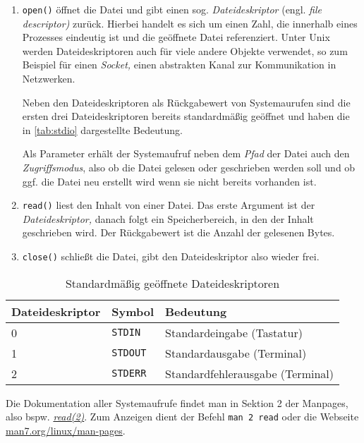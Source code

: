 \begin{enumerate}
  \item \texttt{open()} öffnet die Datei und gibt einen sog. \emph{Dateideskriptor} (engl.
   \emph{file descriptor)} zurück. Hierbei handelt es sich um einen Zahl, die innerhalb eines 
   Prozesses eindeutig ist und die geöffnete Datei referenziert. Unter Unix werden 
   Dateideskriptoren auch für viele andere Objekte verwendet, so zum Beispiel für einen
   \emph{Socket,} einen abstrakten Kanal zur Kommunikation in Netzwerken.

   Neben den Dateideskriptoren als Rückgabewert von Systemaurufen sind die ersten drei 
   Dateideskriptoren bereits standardmäßig geöffnet und haben die in \autoref{tab:stdio} 
   dargestellte Bedeutung.

   Als Parameter erhält der Systemaufruf neben dem \emph{Pfad} der Datei auch den 
   \emph{Zugriffsmodus}, also ob die Datei gelesen oder geschrieben werden soll und ob ggf. die 
   Datei neu erstellt wird wenn sie nicht bereits vorhanden ist.

  \item \texttt{read()} liest den Inhalt von einer Datei. Das erste Argument ist der
   \emph{Dateideskriptor,} danach folgt ein Speicherbereich, in den der Inhalt geschrieben wird.
   Der Rückgabewert ist die Anzahl der gelesenen Bytes.

  \item \texttt{close()} schließt die Datei, gibt den Dateideskriptor also wieder frei.
\end{enumerate}

\begin{table}[htb]
  \centering\small
  \begin{tabular}{|p{1.2cm}ll|}
    \hline
    \textbf{Dateideskriptor} & \textbf{Symbol} & \textbf{Bedeutung} \\
    \hline
      0      & \texttt{STDIN}    & Standardeingabe (Tastatur) \\
      1      & \texttt{STDOUT}   & Standardausgabe (Terminal) \\
      2      & \texttt{STDERR}   & Standardfehlerausgabe (Terminal) \\
    \hline
  \end{tabular}
  \caption{Standardmäßig geöffnete Dateideskriptoren}
  \label{tab:stdio}
\end{table}



Die Dokumentation aller Systemaufrufe findet man in Sektion 2 der Manpages, also bspw.
\href{http://man7.org/linux/man-pages/man2/read.2.html}{\emph{read(2)}}. Zum Anzeigen dient der
Befehl \texttt{man 2 read} oder die Webseite 
\href{http://man7.org/linux/man-pages}{man7.org/linux/man-pages}.

